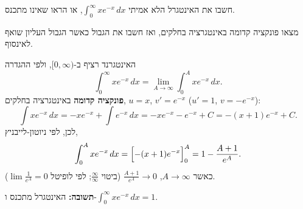 
\begin{question}
חשבו את האינטגרל הלא אמיתי $\int_0^\infty xe^{-x}\,dx$, או הראו שאינו מתכנס.
\end{question}

\begin{hint}
מצאו פונקציה קדומה באינטגרציה בחלקים, ואז חשבו את הגבול כאשר הגבול העליון שואף לאינסוף.
\end{hint}

\begin{solution}
האינטגרנד רציף ב-$[0, \infty)$, ולפי ההגדרה
\[ \int_0^\infty xe^{-x}\,dx = \lim_{A\to\infty}\int_0^A xe^{-x}\,dx. \]
\textbf{פונקציה קדומה} באינטגרציה בחלקים, $u = x$, $v' = e^{-x}$ ($u' = 1$, $v = -e^{-x}$):
\[ \int xe^{-x}\,dx = -xe^{-x} + \int e^{-x}\,dx = -xe^{-x} - e^{-x} + C = -(x + 1)e^{-x} + C. \]
לכן, לפי ניוטון-לייבניץ,
\[ \int_0^A xe^{-x}\,dx = \Bigl[-(x + 1)e^{-x}\Bigr]_0^A = 1 - \frac{A + 1}{e^A}. \]
כאשר $A \to \infty$, $\frac{A + 1}{e^A} \to 0$ (ביטוי $\frac{\infty}{\infty}$; לפי לופיטל $\lim \frac{1}{e^A} = 0$).

\textbf{תשובה:} האינטגרל מתכנס ו-$\boxed{\int_0^\infty xe^{-x}\,dx = 1}$.
\end{solution}
